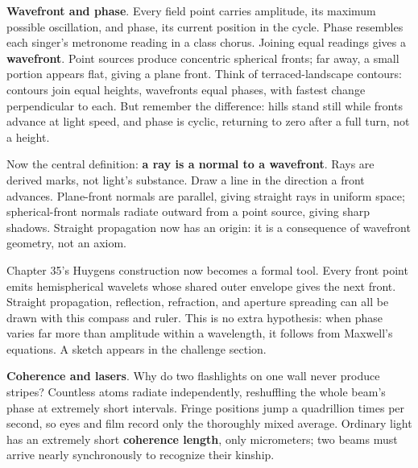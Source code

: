 \textbf{Wavefront and phase}. Every field point carries amplitude, its maximum possible oscillation, and phase, its current position in the cycle. Phase resembles each singer's metronome reading in a class chorus. Joining equal readings gives a \textbf{wavefront}. Point sources produce concentric spherical fronts; far away, a small portion appears flat, giving a plane front. Think of terraced-landscape contours: contours join equal heights, wavefronts equal phases, with fastest change perpendicular to each. But remember the difference: hills stand still while fronts advance at light speed, and phase is cyclic, returning to zero after a full turn, not a height.

Now the central definition: \textbf{a ray is a normal to a wavefront}. Rays are derived marks, not light's substance. Draw a line in the direction a front advances. Plane-front normals are parallel, giving straight rays in uniform space; spherical-front normals radiate outward from a point source, giving sharp shadows. Straight propagation now has an origin: it is a consequence of wavefront geometry, not an axiom.

\begin{center}
\end{center}

Chapter 35's Huygens construction now becomes a formal tool. Every front point emits hemispherical wavelets whose shared outer envelope gives the next front. Straight propagation, reflection, refraction, and aperture spreading can all be drawn with this compass and ruler. This is no extra hypothesis: when phase varies far more than amplitude within a wavelength, it follows from Maxwell's equations. A sketch appears in the challenge section.

\textbf{Coherence and lasers}. Why do two flashlights on one wall never produce stripes? Countless atoms radiate independently, reshuffling the whole beam's phase at extremely short intervals. Fringe positions jump a quadrillion times per second, so eyes and film record only the thoroughly mixed average. Ordinary light has an extremely short \textbf{coherence length}, only micrometers; two beams must arrive nearly synchronously to recognize their kinship.

